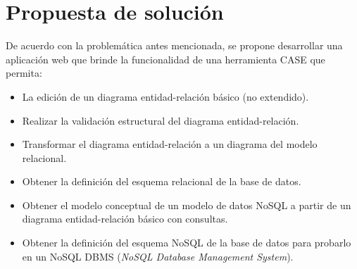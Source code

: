 \section{Propuesta de solución}

De acuerdo con la problemática antes mencionada, se propone desarrollar una aplicación web que brinde la funcionalidad de una herramienta CASE que permita:

\begin{itemize}
    \item La edición de un diagrama entidad-relación básico (no extendido).
    \item Realizar la validación estructural del diagrama entidad-relación.
    \item Transformar el diagrama entidad-relación a un diagrama del modelo relacional.
    \item Obtener la definición del esquema relacional de la base de datos.
    \item Obtener el modelo conceptual de un modelo de datos NoSQL a partir de un diagrama entidad-relación básico con consultas.
    \item Obtener la definición del esquema NoSQL de la base de datos para probarlo en un NoSQL DBMS (\textit{NoSQL Database Management System}).
\end{itemize}